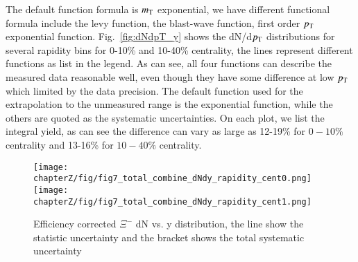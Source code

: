 The default function formula is $m_{\rm T}$ exponential, we have different functional formula include the levy function, the blast-wave function, first order $p_{\rm T}$ exponential function. Fig.~\ref{fig:dNdpT_y} shows the dN/d$p_{\rm T}$ distributions for several rapidity bins for 0-10\% and 10-40\% centrality, the lines represent different functions as list in the legend. As can see, all four functions can describe the measured data reasonable well, even though they have some difference at low $p_{\rm T}$ which limited by the data precision. The default function used for the extrapolation to the unmeasured range is the exponential function, while the others are quoted as the systematic uncertainties. On each plot, we list the integral yield, as can see the difference can vary as large as 12-19\% for $0-10\%$ centrality and 13-16\% for $10-40\%$ centrality.

\begin{figure*}[hbt!]
\texttt{[image: chapterZ/fig/fig7\_total\_combine\_dNdy\_rapidity\_cent0.png]}
\texttt{[image: chapterZ/fig/fig7\_total\_combine\_dNdy\_rapidity\_cent1.png]}
\caption{Efficiency corrected $\Xi^{-}$ dN vs. y distribution, the line show the statistic uncertainty and the bracket shows the total systematic uncertainty}
\label{fig:dNdy}
\end{figure*}

